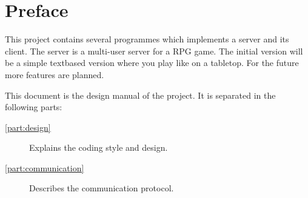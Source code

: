 \chapter{Preface}
\label{chapter:preface}

This project contains several programmes which implements a server and
its client. The server is a multi-user server for a RPG game. The initial
version will be a simple textbased version where you play like on a
tabletop. For the future more features are planned.

This document is the design manual of the project. It is separated in the
following parts:
\begin{description}
\item[\cref{part:design}]
	Explains the coding style and design.
\item[\cref{part:communication}]
	Describes the communication protocol.
\end{description}
